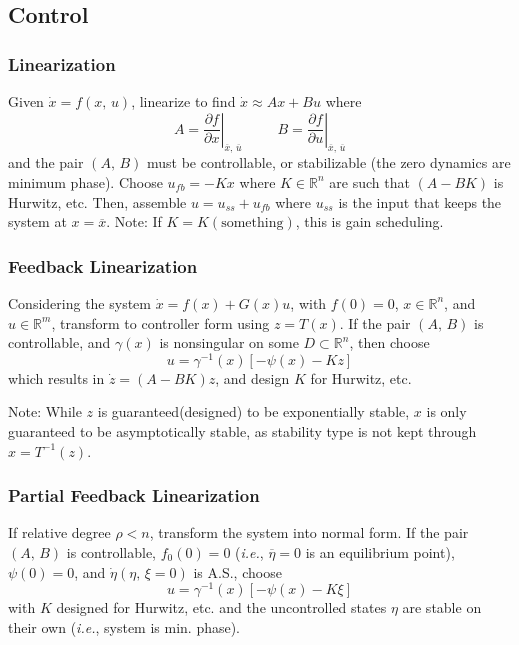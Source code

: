 \documentclass[twocolumn]{article}    %
\begin{document}
\subsection*{Control}
\subsubsection*{Linearization}
Given \(\dot{x} =f(x,\,u)\), linearize to find \(\dot{x} \approx Ax + Bu\) where
\begin{equation*}
    A = \left. \frac{\partial f}{\partial x}\right|_{\overline{x},\, \overline{u}} \hspace{30pt} B = \left. \frac{\partial f}{\partial u}\right|_{\overline{x},\, \overline{u}} 
\end{equation*}
and the pair \((A,\,B)\) must be controllable, or stabilizable (the zero dynamics are minimum phase). Choose \(u_{fb} = - Kx\) where \(K\in \mathds{R}^n\) are such that \((A-BK)\) is Hurwitz, etc.  Then, assemble \(u = u_{ss} + u_{fb}\) where \(u_{ss}\) is the input that keeps the system at \(x =\overline{x}\). Note: If \(K=K(\text{something})\), this is gain scheduling.


\subsubsection*{Feedback Linearization}
Considering the system \(\dot{x} = f(x) + G(x)u\), with \(f(0) = 0\), \(x\in\mathds{R}^n\), and \(u\in\mathds{R}^m\), transform to controller form using \(z=T(x)\). If the pair \((A,\,B)\) is controllable, and \(\gamma(x)\) is nonsingular on some \(D \subset \mathds{R}^n\), then choose 
\begin{equation*}
    u = \gamma^{-1}(x) \left[ -\psi(x) - Kz\right]
\end{equation*}
which results in \(\dot{z} = (A-BK)z\), and design \(K\) for Hurwitz, etc. 

Note: While \(z\) is guaranteed(designed) to be exponentially stable, \(x\) is only guaranteed to be asymptotically stable, as stability type is not kept through \(x = T^{-1}(z)\). 


\subsubsection*{Partial Feedback Linearization}
If relative degree \(\rho < n\), transform the system into normal form. If the pair \((A,\,B)\) is controllable, \(f_0(0) =0\) (\textit{i.e.}, \(\overline{\eta} =0\) is an equilibrium point), \(\psi(0) = 0\), and \(\dot{\eta}(\eta, \,\xi=0)\) is A.S., choose 
\begin{equation*}
    u = \gamma^{-1}(x) \left[-\psi(x) -K\xi\right]
\end{equation*}
with \(K\) designed for Hurwitz, etc. and the uncontrolled states \(\eta\) are stable on their own (\textit{i.e.}, system is min. phase).
\end{document}
